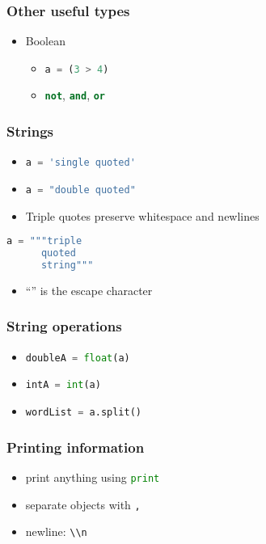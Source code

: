 \documentclass[xcolor=table,10pt,final]{beamer}
\begin{document}
\begin{frame}
  \frametitle{Other useful types}
  \begin{itemize}
    \item Boolean
      \begin{itemize}
        \item \lstinline[language=python]|a = (3 > 4)|
        \item \lstinline[language=python]|not|, \lstinline[language=python]|and|, \lstinline[language=python]|or|
      \end{itemize}
  \end{itemize}
\end{frame}

\begin{frame}[fragile]
  \frametitle{Strings}
  \begin{itemize}
    \item \lstinline[language=python]|a = 'single quoted'|
    \item \lstinline[language=python]|a = "double quoted"|
    \item Triple quotes preserve whitespace and newlines
  \end{itemize}
      \begin{lstlisting}[language=python]
      a = """triple
      quoted
      string"""
      \end{lstlisting}
      \begin{itemize}
    \item ``'' is the escape character
  \end{itemize}
\end{frame}

\begin{frame}
  \frametitle{String operations}
  \begin{itemize}
    \item \lstinline[language=python]|doubleA = float(a)|
    \item \lstinline[language=python]|intA = int(a)|
    \item \lstinline[language=python]|wordList = a.split()|
  \end{itemize}
\end{frame}

\begin{frame}
  \frametitle{Printing information}
  \begin{itemize}
    \item print anything using \lstinline[language=python]|print|
    \item separate objects with \lstinline[language=python]|,|
    \item newline: \lstinline[language=python]|\\n|
  \end{itemize}
\end{frame}
\end{document}
